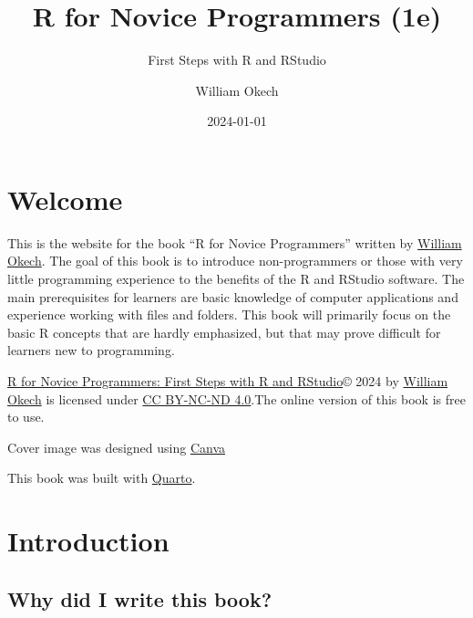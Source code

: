 \documentclass[
  letterpaper,
  DIV=11,
  numbers=noendperiod]{scrreprt}
\title{R for Novice Programmers (1e)}
\subtitle{First Steps with R and RStudio}
\author{William Okech}
\date{2024-01-01}
\renewcommand*\contentsname{Table of contents}
\newcommand\contentsname{Table of contents}
\begin{document}
\maketitle

\renewcommand*\contentsname{Table of contents}
{
\hypersetup{linkcolor=}
\setcounter{tocdepth}{2}
\tableofcontents
}
\listoffigures
\listoftables
{}

\chapter*{Welcome}\label{welcome}


This is the website for the book ``R for Novice Programmers'' written by
\href{https://www.williamokech.com}{William Okech}. The goal of this
book is to introduce non-programmers or those with very little
programming experience to the benefits of the R and RStudio software.
The main prerequisites for learners are basic knowledge of computer
applications and experience working with files and folders. This book
will primarily focus on the basic R concepts that are hardly emphasized,
but that may prove difficult for learners new to programming.

\href{https://wokech.github.io/r4novice/}{R for Novice Programmers:
First Steps with R and RStudio}© 2024 by
\href{https://www.williamokech.com/}{William Okech} is licensed under
\href{http://creativecommons.org/licenses/by-nc-nd/4.0/?ref=chooser-v1}{CC
BY-NC-ND 4.0}.The online version of this book is free to use.

Cover image was designed using \href{https://www.canva.com/}{Canva}

This book was built with \href{https://quarto.org/}{Quarto}.


\chapter*{Introduction}\label{introduction}


\section*{Why did I write this book?}\label{why-did-i-write-this-book}
\end{document}

